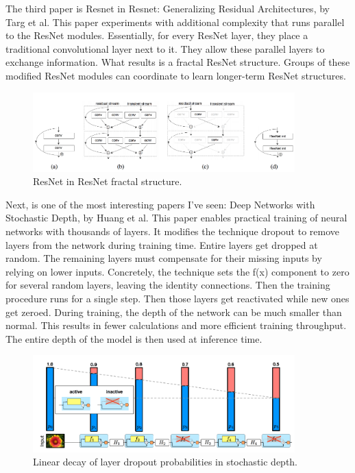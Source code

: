 \documentclass[12pt]{article}
\numberwithin{equation}{section}
\numberwithin{table}{section}
\numberwithin{figure}{section}
\begin{document}
The third paper is Resnet in Resnet: Generalizing Residual Architectures, by Targ et al. This paper experiments with additional complexity that runs parallel to the ResNet modules. Essentially, for every ResNet layer, they place a traditional convolutional layer next to it. They allow these parallel layers to exchange information. What results is a fractal ResNet structure. Groups of these modified ResNet modules can coordinate to learn longer-term ResNet structures.


\begin{figure} \centering
	\includegraphics[width=0.9\textwidth]{image2.png}
	\caption{ResNet in ResNet fractal structure.}
	\label{figure2}
\end{figure}


Next, is one of the most interesting papers I’ve seen: Deep Networks with Stochastic Depth, by Huang et al. This paper enables practical training of neural networks with thousands of layers. It modifies the technique dropout to remove layers from the network during training time. Entire layers get dropped at random. The remaining layers must compensate for their missing inputs by relying on lower inputs. Concretely, the technique sets the f(x) component to zero for several random layers, leaving the identity connections. Then the training procedure runs for a single step. Then those layers get reactivated while new ones get zeroed. During training, the depth of the network can be much smaller than normal. This results in fewer calculations and more efficient training throughput. The entire depth of the model is then used at inference time.


\begin{figure} \centering
	\includegraphics[width=0.9\textwidth]{image3.png}
	\caption{Linear decay of layer dropout probabilities in stochastic depth.}
	\label{figure3}
\end{figure}
\end{document}
